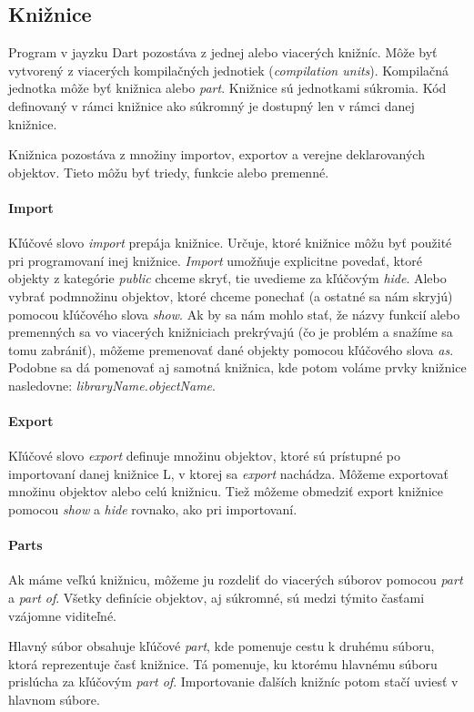 \subsection{Knižnice}
Program v jayzku Dart pozostáva z jednej alebo viacerých knižníc. Môže byť vytvorený z viacerých kompilačných jednotiek (\emph{compilation units}). Kompilačná jednotka môže byť knižnica alebo \emph{part}.
Knižnice sú jednotkami súkromia. Kód definovaný v rámci knižnice ako súkromný je dostupný len v rámci danej knižnice.

Knižnica pozostáva z množiny importov, exportov a verejne deklarovaných objektov. Tieto môžu byť triedy, funkcie alebo premenné.

\paragraph{Import}
Kľúčové slovo \emph{import} prepája knižnice. Určuje, ktoré knižnice môžu byť použité pri programovaní inej knižnice. 
\emph{Import} umožňuje explicitne povedať, ktoré objekty z kategórie \emph{public} chceme skryť, tie uvedieme za kľúčovým \emph{hide}. 
Alebo vybrať podmnožinu objektov, ktoré chceme ponechať (a ostatné sa nám skryjú) pomocou kľúčového slova \emph{show}.
Ak by sa nám mohlo stať, že názvy funkcií alebo premenných sa vo viacerých knižniciach prekrývajú (čo je problém a snažíme sa tomu zabrániť), môžeme premenovať dané objekty pomocou kľúčového slova \emph{as}. 
Podobne sa dá pomenovať aj samotná knižnica, kde potom voláme prvky knižnice nasledovne: \emph{libraryName.objectName}.

\paragraph{Export}
Kľúčové slovo \emph{export} definuje množinu objektov, ktoré sú prístupné po importovaní danej knižnice L, v ktorej sa \emph{export} nachádza. 
Môžeme exportovať množinu objektov alebo celú knižnicu. 
Tiež môžeme obmedziť export knižnice pomocou \emph{show} a \emph{hide} rovnako, ako pri importovaní.

\paragraph{Parts}
Ak máme veľkú knižnicu, môžeme ju rozdeliť do viacerých súborov pomocou \emph{part} a \emph{part of}. 
Všetky definície objektov, aj súkromné, sú medzi týmito časťami vzájomne viditeľné.

Hlavný súbor obsahuje kľúčové \emph{part}, kde pomenuje cestu k druhému súboru, ktorá reprezentuje časť knižnice. Tá pomenuje, ku ktorému hlavnému súboru prislúcha za kľúčovým \emph{part of}.
Importovanie ďalších knižníc potom stačí uviesť v hlavnom súbore.

